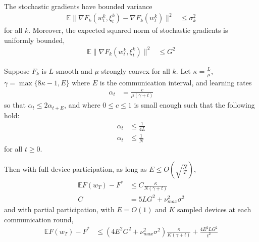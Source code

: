 \begin{assumption}
	The stochastic gradients have bounded variance 
	\begin{align*}
	\mathbb{E}\|\nabla F_{k}(w_{t}^{k},\xi_{t}^{k})-\nabla F_{k}(w_{t}^{k})\|^{2} & \leq\sigma_{k}^{2}
	\end{align*}
	for all $k$. Moreover, the expected squared norm of stochastic gradients
	is uniformly bounded, 
	\begin{align*}
	\mathbb{E}\|\nabla F_{k}(w_{t}^{k},\xi_{t}^{k})\|^{2} & \leq G^{2}
	\end{align*}
\end{assumption}
\begin{theorem}
	Suppose $F_{k}$ is $L$-smooth and $\mu$-strongly convex for all
	$k$. Let $\kappa=\frac{L}{\mu}$, $\gamma=\max\{8\kappa-1,E\}$ where
	$E$ is the communication interval, and learning rates 
	\begin{align*}
	\alpha_{t} & =\frac{c}{\mu(\gamma+t)}
	\end{align*}
	so that $\alpha_{t}\leq2\alpha_{t+E}$, and where $0\leq c\leq1$
	is small enough such that the following hold: 
	\begin{align*}
	\alpha_{t} & \leq\frac{1}{4L}\\
	\alpha_{t} & \leq\frac{1}{N}
	\end{align*}
	for all $t\geq0$. 
	
	Then with full device participation, as long as $E\leq O(\sqrt{\frac{N}{T}})$,
	\begin{align*}
	\mathbb{E}F(w_{T})-F^{\ast} & \leq C\frac{\kappa}{N(\gamma+t)}\\
	C & =5LG^{2}+\nu_{max}^{2}\sigma^{2}
	\end{align*}
	and with partial participation, with $E=O(1)$ and $K$ sampled devices
	at each communication round, 
	\begin{align*}
	\mathbb{E}F(w_{T})-F^{\ast} & \leq(4E^{2}G^{2}+\nu_{max}^{2}\sigma^{2})\frac{\kappa}{K(\gamma+t)}+\frac{4E^{2}LG^{2}}{t^{2}}
	\end{align*}
\end{theorem}
